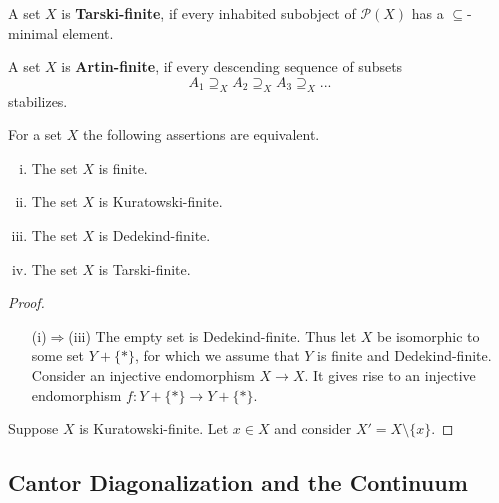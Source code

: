 \documentclass{article}
\begin{document}
	\begin{definition}
		A set $X$ is \textbf{Tarski-finite}, if every inhabited subobject of $\mathcal{P}(X)$ has a $\subseteq$-minimal element.
	\end{definition}

	\begin{definition}
		A set $X$ is \textbf{Artin-finite}, if every descending sequence of subsets
		\begin{equation*}
			A_1 \supseteq_X A_2 \supseteq_X A_3 \supseteq_X ...
		\end{equation*}
		stabilizes.
	\end{definition}

	\begin{theorem}
		For a set $X$ the following assertions are equivalent.
		\begin{enumerate}[(i)]
			\item{
				The set $X$ is finite.
			}
			\item{
				The set $X$ is Kuratowski-finite.
			}
			\item{
				The set $X$ is Dedekind-finite.
			}
			\item{
				The set $X$ is Tarski-finite.
			}
		\end{enumerate}
	\end{theorem}
	\begin{proof}
		\begin{enumerate}
			\item[(i)$\Rightarrow$(iii)]{
				The empty set is Dedekind-finite. Thus let $X$ be isomorphic to some set $Y + \{\ast\}$, for which we assume that $Y$ is finite and Dedekind-finite. Consider an injective endomorphism $X\rightarrow X$. It gives rise to an injective endomorphism $f:Y+\{\ast\} \rightarrow Y+\{\ast\}$. 
			}
		\end{enumerate}

		Suppose $X$ is Kuratowski-finite. Let $x\in X$ and consider $X'=X\setminus\{x\}$.
	\end{proof}




	\newpage

	\subsection{Cantor Diagonalization and the Continuum}
\end{document}
